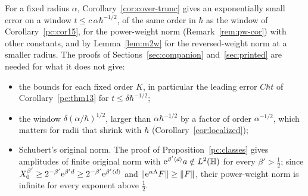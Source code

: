 For a fixed radius $\alpha$, Corollary~\ref{cor:cover-trunc} gives an exponentially small error on a window $t\le c\,\alpha\hbar^{-1/2}$, of the
same order in $\hbar$ as the window of Corollary~\ref{pc:cor15}, for the power-weight norm (Remark~\ref{rem:pw-cor}) with other constants,
and by Lemma~\ref{lem:m2w} for the reversed-weight norm at a smaller radius. The proofs of Sections~\ref{sec:companion}
and~\ref{sec:printed} are needed for what it does not give:
\begin{itemize}
\item the bounds for each fixed order $K$, in particular the leading error $C\hbar t$ of Corollary~\ref{pc:thm13} for
$t\le\delta\hbar^{-1/2}$;
\item the window $\delta(\alpha/\hbar)^{1/2}$, larger than $\alpha\hbar^{-1/2}$ by a factor of order $\alpha^{-1/2}$, which matters for radii
that shrink with $\hbar$ (Corollary~\ref{cor:localized});
\item Schubert's original norm. The proof of Proposition~\ref{pc:classes} gives amplitudes of finite original norm with
$\mathrm{e}^{\beta'\langle d\rangle}a\notin L^2(\mathbb{H})$ for every $\beta'>\tfrac12$; since $X_0^{\beta'}\ge2^{-\beta'}\mathrm{e}^{\beta'd}\ge2^{-\beta'}\mathrm{e}^{\beta'\langle d\rangle}$
and $\lVert \mathrm{e}^{\alpha\Lambda}F\rVert\ge\lVert F\rVert$, their power-weight norm is infinite for every exponent above $\tfrac12$.
\end{itemize}
